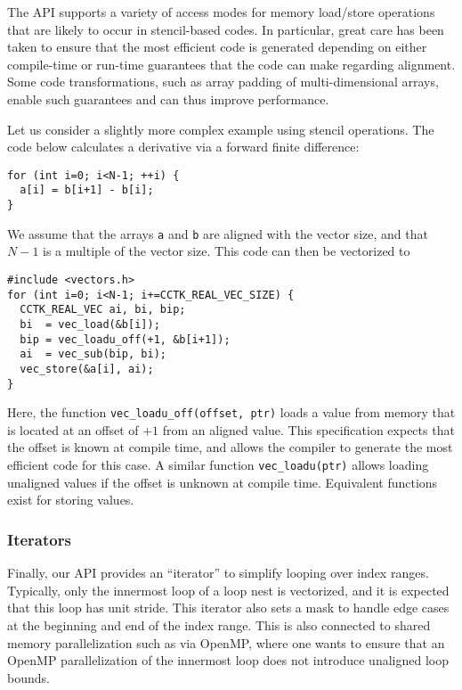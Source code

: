 \documentclass[conference]{IEEEtran}
\begin{document}
The API supports a variety of access modes for memory load/store
operations that are likely to occur in
stencil-based codes. In particular, great care has been taken to
ensure that the most efficient code is generated depending on either
compile-time or run-time guarantees that the code can make regarding
alignment. Some code transformations, such as array padding of
multi-dimensional arrays, enable such guarantees and can thus improve
performance.

Let us consider a slightly more complex example using stencil
operations. The code below calculates a derivative via a forward
finite difference:

\begin{small}
\begin{verbatim}
for (int i=0; i<N-1; ++i) {
  a[i] = b[i+1] - b[i];
}
\end{verbatim}
\end{small}

\noindent We assume that the arrays \verb+a+ and \verb+b+ are aligned
with the vector size, and that $N-1$ is a multiple of the vector size.
This code can then be vectorized to

\begin{small}
\begin{verbatim}
#include <vectors.h>
for (int i=0; i<N-1; i+=CCTK_REAL_VEC_SIZE) {
  CCTK_REAL_VEC ai, bi, bip;
  bi  = vec_load(&b[i]);
  bip = vec_loadu_off(+1, &b[i+1]);
  ai  = vec_sub(bip, bi);
  vec_store(&a[i], ai);
}
\end{verbatim}
\end{small}

\noindent Here, the function \verb+vec_loadu_off(offset, ptr)+ loads a
value from memory that is located at an offset of $+1$ from an aligned
value. This specification expects that the offset is known at compile
time, and allows the compiler to generate the most efficient code for
this case. A similar function \verb+vec_loadu(ptr)+ allows loading
unaligned values if the offset is unknown at compile time. Equivalent
functions exist for storing values.

\subsubsection{Iterators}

Finally, our API provides an
``iterator'' to simplify looping over index ranges. Typically, only
the innermost loop of a loop nest is vectorized, and it is expected
that this loop has unit stride. This iterator also sets a mask to
handle edge cases at the beginning and end of the index range.
This is also connected to shared memory parallelization such as via
OpenMP, where one wants to ensure that an OpenMP parallelization of
the innermost loop does not introduce unaligned loop bounds.
\end{document}
